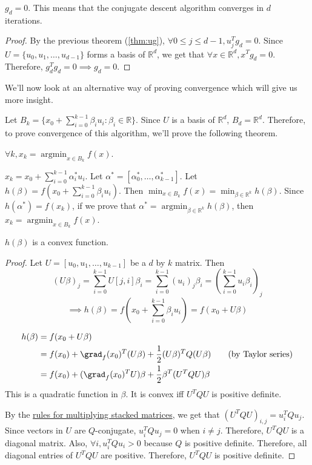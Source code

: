 \begin{corollary}
$g_d = 0$. This means that the conjugate descent algorithm converges in $d$ iterations.
\end{corollary}
\begin{proof}
By the previous theorem (\ref{thm:ug}), $\forall 0 \le j \le d-1, u_j^Tg_d = 0$.
Since $U = \{u_0, u_1, \ldots, u_{d-1}\}$ forms a basis of $\mathbb{R}^d$,
we get that $\forall x \in \mathbb{R}^d, x^Tg_d = 0$.
Therefore, $g_d^Tg_d = 0 \implies g_d = 0$.
\end{proof}

We'll now look at an alternative way of proving convergence
which will give us more insight.

Let $B_k = \{x_0 + \sum_{i=0}^{k-1} \beta_i u_i : \beta_i \in \mathbb{R} \}$.
Since $U$ is a basis of $\mathbb{R}^d$, $B_d = \mathbb{R}^d$.
Therefore, to prove convergence of this algorithm,
we'll prove the following theorem.

\begin{theorem}
\label{thm:exp-subsp}
$\forall k, x_k = \operatorname{argmin}_{x \in B_k} f(x)$.
\end{theorem}

$x_k = x_0 + \sum_{i=0}^{k-1} \alpha_i^* u_i$.
Let $\alpha^* = [\alpha_0^*, \ldots, \alpha_{k-1}^*]$.
Let $h(\beta) = f(x_0 + \sum_{i=0}^{k-1} \beta_i u_i)$.
Then $\min_{x \in B_k} f(x) = \min_{\beta \in \mathbb{R}^k} h(\beta)$.
Since $h(\alpha^*) = f(x_k)$, if we prove that
$\alpha^* = \operatorname{argmin}_{\beta \in \mathbb{R}^k} h(\beta)$,
then $x_k = \operatorname{argmin}_{x \in B_k} f(x)$.

\begin{lemma} $h(\beta)$ is a convex function. \end{lemma}
\begin{proof}
Let $U = [u_0, u_1, \ldots, u_{k-1}]$ be a $d$ by $k$ matrix. Then
\[ (U\beta)_j = \sum_{i=0}^{k-1} U[j, i] \beta_i
= \sum_{i=0}^{k-1} (u_i)_j \beta_i = \left( \sum_{i=0}^{k-1} u_i \beta_i \right)_j \]
\[ \implies h(\beta) = f\left(x_0 + \sum_{i=0}^{k-1} \beta_i u_i \right) = f(x_0 + U\beta) \]

\begin{align*}
h(\beta) &= f(x_0 + U\beta)
\\ &= f(x_0) + \grad_f(x_0)^T(U\beta) + \frac{1}{2}(U\beta)^T Q (U\beta) \tag{by Taylor series}
\\ &= f(x_0) + (\grad_f(x_0)^TU)\beta + \frac{1}{2}\beta^T (U^TQU) \beta
\end{align*}
This is a quadratic function in $\beta$.
It is convex iff $U^TQU$ is positive definite.

By the \href{https://sharmaeklavya2.github.io/theoremdep/nodes/linear-algebra/matrices/stacking/product.html}
{rules for multiplying stacked matrices}, we get that $(U^TQU)_{i,j} = u_i^TQu_j$.
Since vectors in $U$ are $Q$-conjugate, $u_i^TQu_j = 0$ when $i \neq j$.
Therefore, $U^TQU$ is a diagonal matrix.
Also, $\forall i, u_i^TQu_i > 0$ because $Q$ is positive definite.
Therefore, all diagonal entries of $U^TQU$ are positive.
Therefore, $U^TQU$ is positive definite.
\end{proof}

